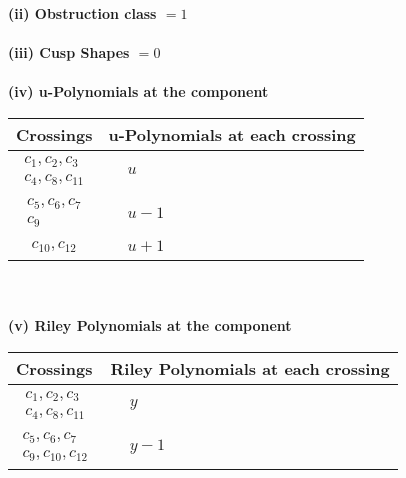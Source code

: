 \documentclass[1p]{elsarticle_modified}
\theoremstyle{definition}
\begin{document}
\flushleft \textbf{(ii) Obstruction class $= 1$}\\~\\
\flushleft \textbf{(iii) Cusp Shapes $= 0$}\\~\\
\newpage\renewcommand{\arraystretch}{1}
\flushleft \textbf{(iv) u-Polynomials at the component}\newline \\
\begin{tabular}{m{50pt}|m{274pt}}
Crossings & \hspace{64pt}u-Polynomials at each crossing \\
\hline $$\begin{aligned}c_{1},c_{2},c_{3}\\c_{4},c_{8},c_{11}\end{aligned}$$&$\begin{aligned}
&u
\end{aligned}$\\
\hline $$\begin{aligned}c_{5},c_{6},c_{7}\\c_{9}\end{aligned}$$&$\begin{aligned}
&u-1
\end{aligned}$\\
\hline $$\begin{aligned}c_{10},c_{12}\end{aligned}$$&$\begin{aligned}
&u+1
\end{aligned}$\\
\hline
\end{tabular}\\~\\
\newpage\renewcommand{\arraystretch}{1}
\flushleft \textbf{(v) Riley Polynomials at the component}\newline \\
\begin{tabular}{m{50pt}|m{274pt}}
Crossings & \hspace{64pt}Riley Polynomials at each crossing \\
\hline $$\begin{aligned}c_{1},c_{2},c_{3}\\c_{4},c_{8},c_{11}\end{aligned}$$&$\begin{aligned}
&y
\end{aligned}$\\
\hline $$\begin{aligned}c_{5},c_{6},c_{7}\\c_{9},c_{10},c_{12}\end{aligned}$$&$\begin{aligned}
&y-1
\end{aligned}$\\
\hline
\end{tabular}\\~\\
\end{document}
